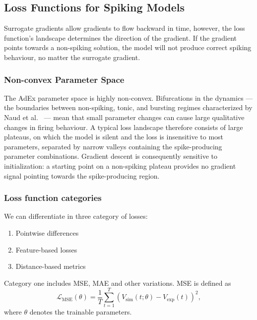 \subsection{Loss Functions for Spiking Models}\label{sec:bg:loss-functions}

Surrogate gradients allow gradients to flow backward in time, however, the loss function's landscape determines the direction of the gradient.
If the gradient points towards a non-spiking solution, the model will not produce correct spiking behaviour, no matter the surrogate gradient.

\subsubsection{Non-convex Parameter Space}\label{sec:bg:loss:param-space}
The AdEx parameter space is highly non-convex.
Bifurcations in the dynamics --- the boundaries between non-spiking, tonic, and bursting regimes characterized by Naud et al.~\cite{Naud2008} --- mean that small parameter changes can cause large qualitative changes in firing behaviour.
A typical loss landscape therefore consists of large plateaus, on which the model is silent and the loss is insensitive to most parameters, separated by narrow valleys containing the spike-producing parameter combinations.
Gradient descent is consequently sensitive to initialization: a starting point on a non-spiking plateau provides no gradient signal pointing towards the spike-producing region.

\subsubsection{Loss function categories}\label{sec:bg:loss:categories}
We can differentiate in three category of losses:
\begin{enumerate}
  \item Pointwise differences
  \item Feature-based losses
  \item Distance-based metrics
\end{enumerate}
Category one includes \gls{MSE}, \gls{MAE} and other variations.
\gls{MSE} is defined as
\begin{equation}\label{eq:MSE}
    \mathcal{L}_{\text{MSE}}(\theta) = \frac{1}{T} \sum_{t=1}^{T} \left( V_{\text{sim}}(t; \theta) - V_{\text{exp}}(t) \right)^2,
\end{equation}
where $\theta$ denotes the trainable parameters.


